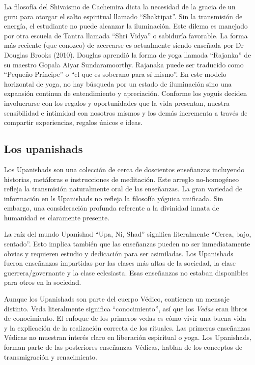 La filosofía del Shivaismo de Cachemira dicta la necesidad de la gracia de un guru para otorgar el salto espiritual llamado ``Shaktipat''. Sin la transmisión de energía, el estudiante no puede alcanzar la iluminación. Este dilema es manejado por otra escuela de Tantra llamada ``Shri Vidya'' o sabiduría favorable. La forma más reciente (que conozco) de acercarse es actualmente siendo enseñada por Dr Douglas Brooks (2010). Douglas aprendió la forma de yoga llamada ``Rajanka'' de su maestro Gopala Aiyar Sundaramoorthy. Rajanaka puede ser traducido como ``Pequeño Príncipe'' o ``el que es soberano para sí mismo''. En este modelo horizontal de yoga, no hay búsqueda por un estado de iluminación sino una expansión continua de entendimiento y apreciación. Conforme los yoguis deciden involucrarse con los regalos y oportunidades que la vida presentan, nuestra sensibilidad e intimidad con nosotros mismos y los demás incrementa a trav\'es de compartir experiencias, regalos únicos e ideas.

\subsection{Los upanishads}
Los Upanishads son una colección de cerca de doscientos enseñanzas incluyendo historias, metáforas e instrucciones de meditación. Este arreglo no-homog\'eneo refleja la transmisión naturalmente oral de las enseñanzas. La gran variedad de información en ls Upanishads no refleja la filosofía yóguica unificada. Sin embargo, una consideración profunda referente a la divinidad innata de humanidad es claramente presente.

La raíz del mundo Upanishad ``Upa, Ni, Shad'' significa literalmente ``Cerca, bajo, sentado''. Esto implica tambi\'en que las enseñanzas pueden no ser inmediatamente obvias y requieren estudio y dedicación para ser asimiladas. Los Upanishads fueron enseñanzas impartidas por las clases más altas de la sociedad, la clase guerrera/governante y la clase eclesiasta. Esas enseñanzas no estaban disponibles para otros en la sociedad.

Aunque los Upanishads son parte del cuerpo V\'edico, contienen un mensaje distinto. Veda literalmente significa ``conocimiento'', así que los \textit{Vedas} eran libros de conocimiento. El enfoque de los primeros vedas es cómo vivir una buena vida y la explicación de la realización correcta de los rituales. Las primeras enseñanzas V\'edicas no muestran inter\'es claro en liberación espiritual o yoga. Los Upanishads, forman parte de las posteriores enseñanzas V\'edicas, hablan de los conceptos de transmigración y renacimiento.

